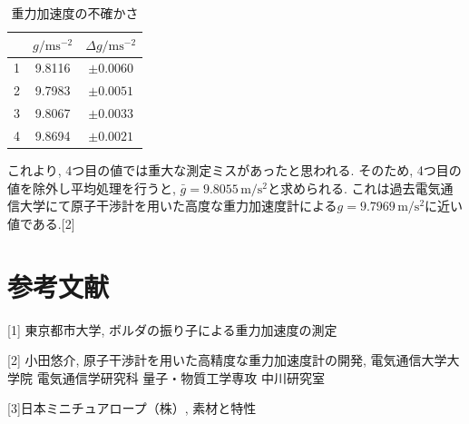 \documentclass{jarticle}
\begin{document}
\begin{table}[H]
  \centering
  \caption{重力加速度の不確かさ}
  \begin{tabular}{ccc}
    \hline
    & $g/\mathrm{ms^{-2}}$ & $\Delta g/\mathrm{ms^{-2}}$ \\
    \hline
    1 & 9.8116 & $\pm 0.0060$ \\
    2 & 9.7983 & $\pm 0.0051$ \\
    3 & 9.8067 & $\pm 0.0033$ \\
    4 & 9.8694 & $\pm 0.0021$ \\
    \hline
  \end{tabular}
\end{table}

これより, 4つ目の値では重大な測定ミスがあったと思われる. そのため, 4つ目の値を除外し平均処理を行うと, $\bar{g}=9.8055\,\mathrm{m/s^2}$と求められる. これは過去電気通信大学にて原子干渉計を用いた高度な重力加速度計による$g=9.7969\,\mathrm{m/s^2}$に近い値である.[2]


\section{参考文献}

[1] 東京都市大学, ボルダの振り子による重力加速度の測定

[2] 小田悠介, 原子干渉計を用いた高精度な重力加速度計の開発, 電気通信大学大学院 電気通信学研究科 量子・物質工学専攻 中川研究室

[3]日本ミニチュアロープ（株）, 素材と特性

  
\end{document}
